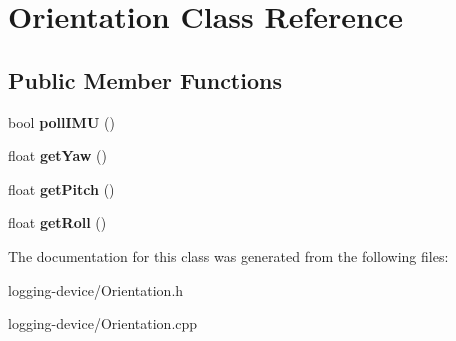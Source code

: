 \hypertarget{class_orientation}{}\section{Orientation Class Reference}
\label{class_orientation}
\subsection*{Public Member Functions}
\begin{DoxyCompactItemize}
\item 
\mbox{\label{class_orientation_aad568a473f999c181abac46a4d832387}} 
bool {\bfseries poll\+I\+MU} ()
\item 
\mbox{\label{class_orientation_a3dbaa1ee014811c40d5b9f39b544c19b}} 
float {\bfseries get\+Yaw} ()
\item 
\mbox{\label{class_orientation_a7ec1a2964fc858bbd5da22a505b087c8}} 
float {\bfseries get\+Pitch} ()
\item 
\mbox{\label{class_orientation_ab8923432cb8c18822b0a9ae95a5ac505}} 
float {\bfseries get\+Roll} ()
\end{DoxyCompactItemize}


The documentation for this class was generated from the following files\+:\begin{DoxyCompactItemize}
\item 
logging-\/device/Orientation.\+h\item 
logging-\/device/Orientation.\+cpp\end{DoxyCompactItemize}
